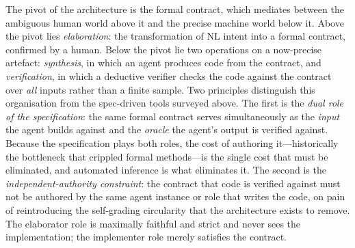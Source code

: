 The pivot of the architecture is the formal contract, which mediates between the ambiguous human world above it and the precise machine world below it. Above the pivot lies \emph{elaboration}: the transformation of NL intent into a formal contract, confirmed by a human. Below the pivot lie two operations on a now-precise artefact: \emph{synthesis}, in which an agent produces code from the contract, and \emph{verification}, in which a deductive verifier checks the code against the contract over \emph{all} inputs rather than a finite sample. Two principles distinguish this organisation from the spec-driven tools surveyed above. The first is the \emph{dual role of the specification}: the same formal contract serves simultaneously as the \emph{input} the agent builds against and the \emph{oracle} the agent's output is verified against. Because the specification plays both roles, the cost of authoring it---historically the bottleneck that crippled formal methods---is the single cost that must be eliminated, and automated inference is what eliminates it. The second is the \emph{independent-authority constraint}: the contract that code is verified against must not be authored by the same agent instance or role that writes the code, on pain of reintroducing the self-grading circularity that the architecture exists to remove. The elaborator role is maximally faithful and strict and never sees the implementation; the implementer role merely satisfies the contract.


